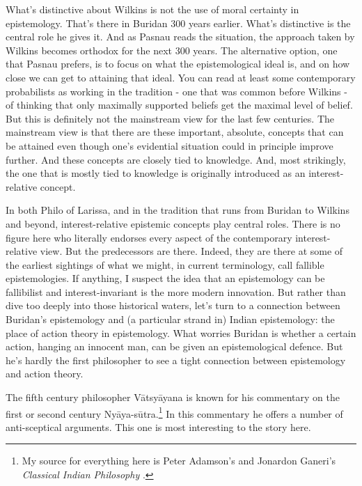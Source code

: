 \documentclass[
  11pt,
]{book}
\begin{document}
What's distinctive about Wilkins is not the use of moral certainty in epistemology. That's there in Buridan 300 years earlier. What's distinctive is the central role he gives it. And as Pasnau reads the situation, the approach taken by Wilkins becomes orthodox for the next 300 years. The alternative option, one that Pasnau prefers, is to focus on what the epistemological ideal is, and on how close we can get to attaining that ideal. You can read at least some contemporary probabilists as working in the tradition - one that was common before Wilkins - of thinking that only maximally supported beliefs get the maximal level of belief. But this is definitely not the mainstream view for the last few centuries. The mainstream view is that there are these important, absolute, concepts that can be attained even though one's evidential situation could in principle improve further. And these concepts are closely tied to knowledge. And, most strikingly, the one that is mostly tied to knowledge is originally introduced as an interest-relative concept.

In both Philo of Larissa, and in the tradition that runs from Buridan to Wilkins and beyond, interest-relative epistemic concepts play central roles. There is no figure here who literally endorses every aspect of the contemporary interest-relative view. But the predecessors are there. Indeed, they are there at some of the earliest sightings of what we might, in current terminology, call fallible epistemologies. If anything, I suspect the idea that an epistemology can be fallibilist and interest-invariant is the more modern innovation. But rather than dive too deeply into those historical waters, let's turn to a connection between Buridan's epistemology and (a particular strand in) Indian epistemology: the place of action theory in epistemology. What worries Buridan is whether a certain action, hanging an innocent man, can be given an epistemological defence. But he's hardly the first philosopher to see a tight connection between epistemology and action theory.

The fifth century philosopher Vātsyāyana is known for his commentary on the first or second century Nyāya-sūtra.\footnote{My source for everything here is Peter Adamson's and Jonardon Ganeri's \emph{Classical Indian Philosophy} \citep{AdamsonGaneri2020}.} In this commentary he offers a number of anti-sceptical arguments. This one is most interesting to the story here.
\end{document}
